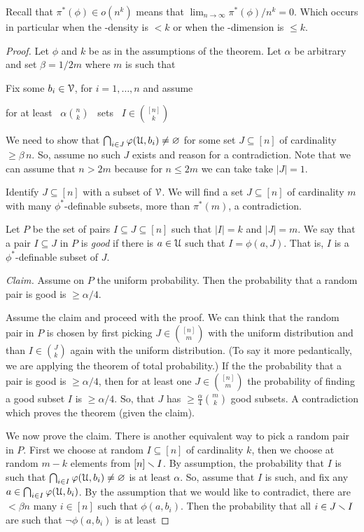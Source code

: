 \documentclass[sputnik.tex]{subfiles}
\begin{document}
Recall that $\pi^*(\phi)\in o(n^k)$ means that $\lim_{n\to\infty}\pi^*(\phi)/n^k=0$.
Which occurs in particular when the \vc-density is $<k$ or when the \vc-dimension is $\le k$.
\begin{proof}
Let $\phi$ and $k$ be as in the assumptions of the theorem.
Let $\alpha$ be arbitrary and set $\beta=1/2m$ where $m$ is such that 


Fix some  $b_i\in\EuScript V$, for $i=1,\dots,n$ and assume
 
\quad for at least \ $\displaystyle\alpha{n\choose k}$ \ sets \ $\displaystyle I\in{[n]\choose k}$

We need to show that $\bigcap_{i\in J}\varphi(\EuScript U,b_i)\neq\varnothing$ for some  set $J\subseteq [n]$ of cardinality $\ge\beta\,n$.
So, assume no such $J$ exists and reason for a contradiction.
Note that we can assume that $n>2m$ because for $n\le2m$ we can take take $|J|=1$.

Identify $J\subseteq[n]$ with a subset of $\EuScript V$.
We will find a set $J\subseteq[n]$ of cardinality $m$ with many $\phi^*$-definable subsets, more than $\pi^*(m)$, a contradiction.

Let $P$ be the set of pairs $I\subseteq J\subseteq[n]$ such that $|I|=k$ and $|J|=m$.
We say that a pair $I\subseteq J$ in $P$ is \textit{good\/} if there is $a\in\EuScript U$ such that $I=\phi(a,J)$.
That is, $I$ is a $\phi^*$-definable subset of $J$.

\textit{Claim.} Assume on $P$ the uniform probability.
Then the probability that a random pair is good is $\ge\alpha/4$.

Assume the claim and proceed with the proof.
We can think that the random pair in $P$ is chosen by first picking $J\in{[n]\choose m}$ with the uniform distribution and than $I\in{J\choose k}$ again with the uniform distribution. 
(To say it more pedantically, we are applying the theorem of total probability.)
If the the probability that a pair is good is $\ge\alpha/4$, then for at least one $J\in{[n]\choose m}$ the probability of finding a good subset $I$ is $\ge\alpha/4$.
So, that $J$ has $\ge\frac\alpha4{m\choose k}$ good subsets.
A contradiction which proves the theorem (given the claim).

We now prove the claim.
There is another equivalent way to pick a random pair in $P$.
First we choose at random $I\subseteq[n]$ of cardinality $k$, then we choose at random $m-k$ elements from $[n]\smallsetminus I$.
By assumption, the probability that $I$ is such that $\bigcap_{i\in I}\varphi(\EuScript U,b_i)\neq\varnothing$ is at least $\alpha$.
So, assume that $I$ is such, and fix any $a\in \bigcap_{i\in I}\varphi(\EuScript U,b_i)$.
By the assumption that we would like to contradict, there are $<\beta n$ many $i\in[n]$ such that $\phi(a,b_i)$.
Then the probability that all $i\in J\smallsetminus I$ are such that $\neg\phi(a,b_i)$ is at least


\end{proof}
\end{document}
